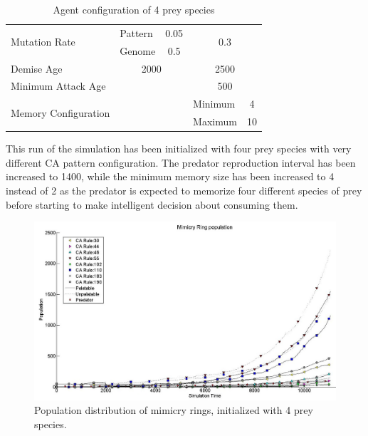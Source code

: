 \begin{table}[H]
\begin{tabular}{|l|l|c|c|l|c|}
  \multirow{2}{*}{Mutation Rate} & Pattern   & \multicolumn{2}{|c|}{0.05} & \multicolumn{2}{|c|}{\multirow{2}{*}{0.3}} \\ \cline{2-4}
  						 									 & Genome    & \multicolumn{2}{|c|}{0.5}  & \multicolumn{2}{|c|}{} \\ \hline
  Demise Age	 									 & \multicolumn{3}{|c|}{2000}							& \multicolumn{2}{|c|}{2500} \\ \hline
  Minimum Attack Age						 & \multicolumn{3}{|c|}{} 						    & \multicolumn{2}{|c|}{500} \\ \hline
  \multirow{2}{*}{Memory Configuration} & \multicolumn{3}{|c|}{} 					& Minimum & 4 \\ \cline{5-6}
   																			& \multicolumn{3}{|c|}{} 					& Maximum & 10 \\ \hline  
\end{tabular}
\caption{Agent configuration of 4 prey species}
\label{tab:config-table-4-prey}
\end{table}

This run of the simulation has been initialized with four prey species with very different CA pattern configuration. The predator reproduction interval has been increased to 1400, while the minimum memory size has been increased to 4 instead of 2 as the predator is expected to memorize four different species of prey before starting to make intelligent decision about consuming them. 

\begin{figure}[H]
	\centering
	\includegraphics[scale=0.40]{images/simTime10k-4Prey}
	\caption[Population distribution of mimicry rings (4 prey species)]{Population distribution of mimicry rings, initialized with 4 prey species.}
	\label{fig:plot-4-prey}
\end{figure}

